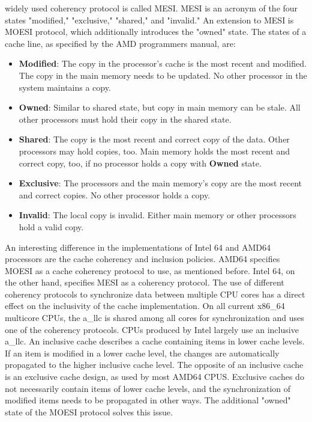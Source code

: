 widely used coherency protocol is called MESI. MESI is an acronym of the four
states "modified," "exclusive," "shared," and "invalid." An extension to MESI is
MOESI protocol, which additionally introduces the "owned" state. The states of a
cache line, as specified by the AMD programmers manual, are:
\begin{itemize}
    \item \textbf{Modified}: The copy in the processor's cache is the most
          recent and modified. The copy in the main memory needs to be updated.
          No other processor in the system maintains a copy.
    \item \textbf{Owned}: Similar to shared state, but copy in main memory can
          be stale. All other processors must hold their copy in the shared
          state.
    \item \textbf{Shared}:  The copy is the most recent and correct copy of the
          data. Other processors may hold copies, too. Main memory holds the
          most recent and correct copy, too, if no processor holds a copy with
          \textbf{Owned} state.
    \item \textbf{Exclusive}: The processors and the main memory's copy are the
          most recent and correct copies. No other processor holds a copy.
    \item \textbf{Invalid}: The local copy is invalid. Either main memory or
          other processors hold a valid copy.
\end{itemize}

An interesting difference in the implementations of Intel 64 and AMD64
processors are the cache coherency and inclusion policies. AMD64 specifies MOESI
as a cache coherency protocol to use, as mentioned before.\cite{amd_manual}
Intel 64, on the other hand, specifies MESI as a coherency protocol.
\cite{intel_sdm} The use of different coherency protocols to synchronize data
between multiple CPU cores has a direct effect on the inclusivity of the cache
implementation. On all current x86\_64 multicore CPUs, the \acrfull{a_llc} is
shared among all cores for synchronization and uses one of the coherency
protocols. CPUs produced by Intel largely use an inclusive \acrshort{a_llc}. An
inclusive cache describes a cache containing items in lower cache levels. If an
item is modified in a lower cache level, the changes are automatically
propagated to the higher inclusive cache level. The opposite of an inclusive
cache is an exclusive cache design, as used by most AMD64 CPUS. Exclusive caches
do not necessarily contain items of lower cache levels, and the synchronization
of modified items needs to be propagated in other ways. The additional "owned"
state of the MOESI protocol solves this issue.

